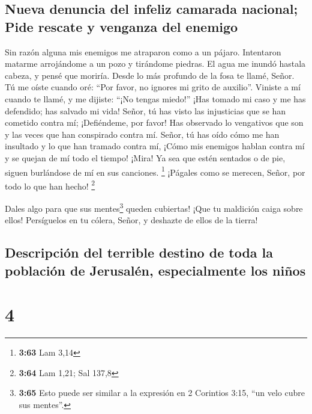 \hypertarget{nueva-denuncia-del-infeliz-camarada-nacional-pide-rescate-y-venganza-del-enemigo}{%
\subsection{Nueva denuncia del infeliz camarada nacional; Pide rescate y
venganza del
enemigo}\label{nueva-denuncia-del-infeliz-camarada-nacional-pide-rescate-y-venganza-del-enemigo}}

 Sin razón alguna mis enemigos me atraparon como a un
pájaro.  Intentaron matarme arrojándome a un pozo y
tirándome piedras.  El agua me inundó hastala cabeza, y
pensé que moriría.  Desde lo más profundo de la fosa te
llamé, Señor.  Tú me oíste cuando oré: ``Por favor, no
ignores mi grito de auxilio''.  Viniste a mí cuando te
llamé, y me dijiste: ``¡No tengas miedo!''  ¡Has tomado
mi caso y me has defendido; has salvado mi vida!  Señor,
tú has visto las injusticias que se han cometido contra mí; ¡Defiéndeme,
por favor!  Has observado lo vengativos que son y las
veces que han conspirado contra mí.  Señor, tú has oído
cómo me han insultado y lo que han tramado contra mí, 
¡Cómo mis enemigos hablan contra mí y se quejan de mí todo el tiempo!
 ¡Mira! Ya sea que estén sentados o de pie, siguen
burlándose de mí en sus canciones. \footnote{\textbf{3:63} Lam 3,14}
 ¡Págales como se merecen, Señor, por todo lo que han
hecho! \footnote{\textbf{3:64} Lam 1,21; Sal 137,8}

 Dales algo para que sus mentes\footnote{\textbf{3:65}
  Esto puede ser similar a la expresión en 2 Corintios 3:15, ``un velo
  cubre sus mentes''.} queden cubiertas! ¡Que tu maldición caiga sobre
ellos!  Persíguelos en tu cólera, Señor, y deshazte de
ellos de la tierra!

\hypertarget{descripciuxf3n-del-terrible-destino-de-toda-la-poblaciuxf3n-de-jerusaluxe9n-especialmente-los-niuxf1os}{%
\subsection{Descripción del terrible destino de toda la población de
Jerusalén, especialmente los
niños}\label{descripciuxf3n-del-terrible-destino-de-toda-la-poblaciuxf3n-de-jerusaluxe9n-especialmente-los-niuxf1os}}

\hypertarget{section-3}{%
\section{4}\label{section-3}}

